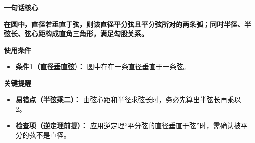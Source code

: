 \begin{summarybox}
	\textbf{\textcolor{CSummary}{一句话核心}}

	\textbf{在圆中，直径若垂直于弦，则该直径平分弦且平分弦所对的两条弧；同时半径、半弦长、弦心距构成直角三角形，满足勾股关系。}

	\medskip
	\textbf{\textcolor{CSummary}{使用条件}}
	\begin{itemize}[leftmargin=*, itemsep=0.5em, topsep=0.4em]
		\item \textbf{条件1（直径垂直弦）：} 圆中存在一条直径垂直于一条弦。
	\end{itemize}

	\medskip
	\textbf{\textcolor{CSummary}{关键提醒}}
	\begin{itemize}[leftmargin=*, itemsep=0.5em, topsep=0.4em]
		\item \textbf{易错点（半弦乘二）：} 由弦心距和半径求弦长时，务必先算出半弦长再乘以2。
		\item \textbf{检查项（逆定理前提）：} 应用逆定理“平分弦的直径垂直于弦”时，需确认被平分的弦不是直径。
	\end{itemize}
\end{summarybox}
